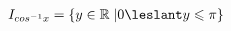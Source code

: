 \documentclass[preview]{standalone}
\begin{document}
\begin{align*}
I_{cos^{-1} x } = \{ y \in \mathbb{R} \; | 0 \leslant y \leqslant \pi \}
\end{align*}
\end{document}
